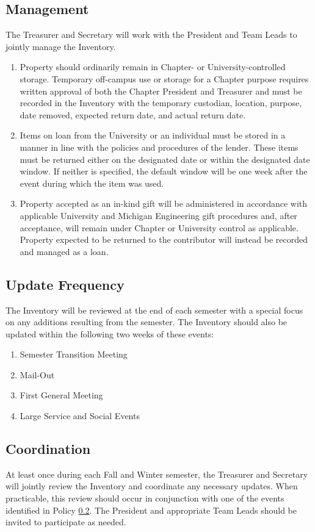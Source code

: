 \subsection{Management} \label{V.4}
The Treasurer and Secretary will work with the President and Team Leads to jointly manage the Inventory.
\begin{enumerate}
    \item Property should ordinarily remain in Chapter- or University-controlled storage. 
    Temporary off-campus use or storage for a Chapter purpose requires written approval of both the Chapter President and Treasurer and must be 
    recorded in the Inventory with the temporary custodian, location, purpose, date removed, expected return date, and actual return date.
    \item Items on loan from the University or an individual must be stored in a manner in line with the policies and procedures of the lender. 
    These items must be returned either on the designated date or within the designated date window. 
    If neither is specified, the default window will be one week after the event during which the item was used.
    \item Property accepted as an in-kind gift will be administered in accordance with applicable University and Michigan Engineering gift procedures and, after acceptance, 
    will remain under Chapter or University control as applicable. 
    Property expected to be returned to the contributor will instead be recorded and managed as a loan.
\end{enumerate}

\subsection{Update Frequency} \label{V.5}
The Inventory will be reviewed at the end of each semester with a special focus on any additions resulting from the semester. 
The Inventory should also be updated within the following two weeks of these events:
\begin{enumerate}
    \item Semester Transition Meeting
    \item Mail-Out
    \item First General Meeting
    \item Large Service and Social Events
\end{enumerate}

\subsection{Coordination} \label{V.6}
At least once during each Fall and Winter semester, the Treasurer and Secretary will jointly review the Inventory and coordinate any necessary updates. 
When practicable, this review should occur in conjunction with one of the events identified in Policy \ref{V.5}. 
The President and appropriate Team Leads should be invited to participate as needed.

